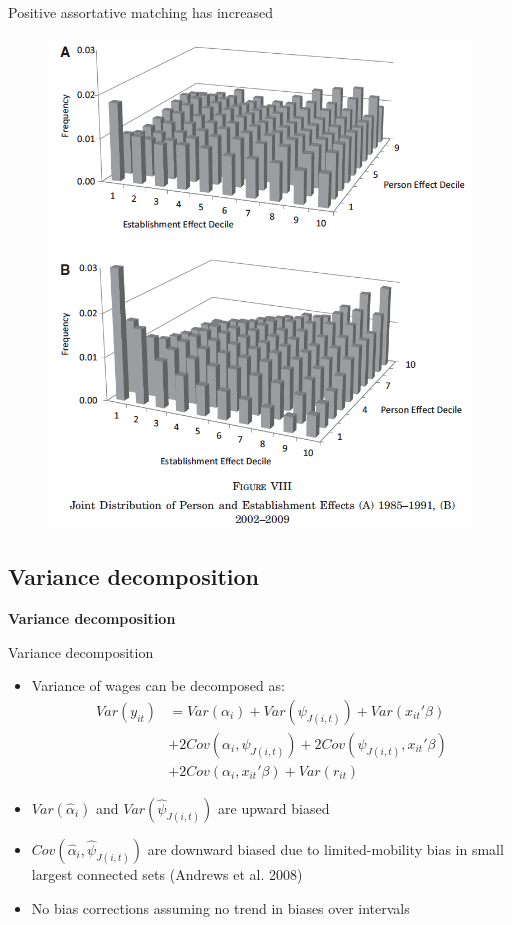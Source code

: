 \documentclass[notes=show]{beamer}
\begin{document}
\begin{frame}{Positive assortative matching has increased}
\begin{figure}[p!]
	\begin{adjustbox}
 \includegraphics[width=.65\textwidth]{figures/Fig8}
 	\end{adjustbox} 
\end{figure}
\end{frame}

\subsection*{Variance decomposition}

\begin{frame}
	\centering
	\textbf{Variance decomposition}
\end{frame}

\begin{frame}{Variance decomposition}
\begin{itemize}
    \item Variance of wages can be decomposed as:
	\begin{equation}
	\begin{split}
		Var(y_{it})& = Var(\alpha_i)+Var(\psi_{J(i,t)})+Var(x_{it}'\beta) \\
				&+ 2Cov(\alpha_i,\psi_{J(i,t)})+2Cov(\psi_{J(i,t)},x_{it}'\beta) \\
				&+ 2Cov(\alpha_i,x_{it}'\beta) + Var(r_{it})
	\end{split}
	\end{equation}
 \item $ Var(\hat{\alpha}_{i}) $ and $ Var(\hat{\psi}_{J(i,t)}) $ are upward biased \medskip
 \item $Cov(\hat{\alpha}_i, \hat{\psi}_{J(i,t)}) $ are downward biased due to limited-mobility bias in small largest connected sets (Andrews et al. 2008) \medskip
 \item No bias corrections assuming no trend in biases over intervals
\end{itemize}
\end{frame}
\end{document}
